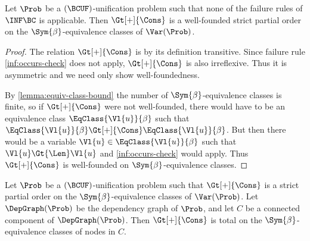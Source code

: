 \begin{Lemma}\label{lemma:gt-cons-partial-order}
    Let $\Prob$ be a $(\BCUF)$-unification problem such that none of the
    failure rules of $\INF\BC$ is applicable. Then $\Gt[+]{\Cons}$ is a
    wel{}l-founded strict partial order on the $\Sym{\beta}$-equivalence
    classes of $\Var(\Prob)$.
\end{Lemma}

\begin{proof}
    The relation $\Gt[+]{\Cons}$ is by its definition transitive. Since failure
    rule \ref{inf:occurs-check} does not apply, $\Gt[+]{\Cons}$ is also
    irreflexive. Thus it is asymmetric and we need only show well-foundedness.

    By \cref{lemma:equiv-class-bound} the number of $\Sym{\beta}$-equivalence
    classes is finite, so if $\Gt[+]{\Cons}$ were not well-founded, there would
    have to be an equivalence class $\EqClass{\Vl{u}}{\beta}$ such that
    $\EqClass{\Vl{u}}{\beta} \Gt[+]{\Cons} \EqClass{\Vl{u}}{\beta}$. But then
    there would be a variable $\Vl{u} \in \EqClass{\Vl{u}}{\beta}$ such that
    $\Vl{u} \Gt{\Len} \Vl{u}$ and \ref{inf:occurs-check} would apply. Thus
    $\Gt[+]{\Cons}$ is well-founded on $\Sym{\beta}$-equivalence classes.
\end{proof}

\begin{Lemma}\label{lemma:total-connected-comp}
    Let $\Prob$ be a $(\BCUF)$-unification problem such that $\Gt[+]{\Cons}$ is
    a strict partial order on the $\Sym{\beta}$-equivalence classes of
    $\Var(\Prob)$. Let $\DepGraph(\Prob)$ be the dependency graph of $\Prob$,
    and let $C$ be a connected component of $\DepGraph(\Prob)$. Then
    $\Gt[+]{\Cons}$ is total on the $\Sym{\beta}$-equivalence classes of nodes
    in $C$.
\end{Lemma}

